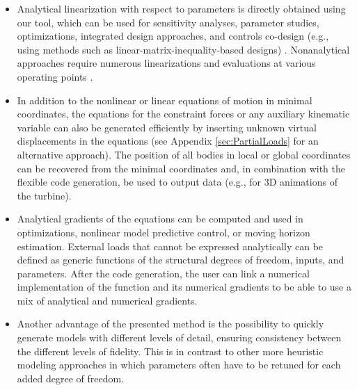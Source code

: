 \documentclass[wes, manuscript]{copernicus}
\begin{document}
\begin{itemize}
\item Analytical linearization with respect to parameters is directly obtained using our tool, which can be used for sensitivity analyses, parameter studies, optimizations, integrated design approaches, and controls co-design (e.g., using methods such as linear-matrix-inequality-based designs) \citep{Poschke:2020}.  Nonanalytical approaches require numerous linearizations and evaluations at various operating points \citep{Jonkman:2022lin}.

\item In addition to the nonlinear or linear equations of motion in minimal coordinates, the equations for the constraint forces or any auxiliary kinematic variable can also be generated efficiently by inserting unknown virtual displacements in the equations (see Appendix \ref{sec:PartialLoads} for an alternative approach). 
The position of all bodies in local or global coordinates can be recovered from the minimal coordinates and, in combination with the flexible code generation, be used to output data (e.g., for 3D animations of the turbine). 

\item Analytical gradients of the equations can be computed and used in optimizations,
nonlinear model predictive control, or moving horizon estimation.
    External loads that cannot be expressed analytically can be defined as generic functions of the structural degrees of freedom, inputs, and parameters.
    After the code generation, the user can link a numerical implementation of the function and its numerical gradients to be able to use a mix of analytical and numerical gradients.

\item Another advantage of the presented method is the possibility to quickly generate models with different levels of detail, ensuring consistency between the different levels of fidelity.
This is in contrast to other more heuristic modeling approaches in which parameters often have to be retuned for each added degree of freedom.


\end{itemize}
\end{document}
